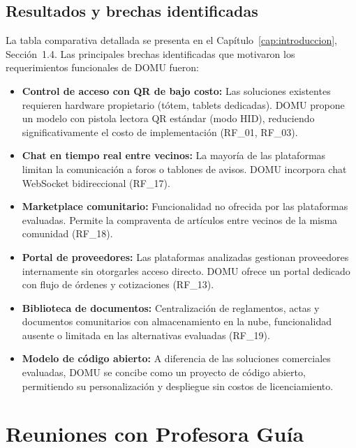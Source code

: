 \subsection{Resultados y brechas identificadas}

La tabla comparativa detallada se presenta en el Capítulo~\ref{cap:introduccion}, Sección~1.4. Las principales brechas identificadas que motivaron los requerimientos funcionales de DOMU fueron:

\begin{itemize}
    \item \textbf{Control de acceso con QR de bajo costo:} Las soluciones existentes requieren hardware propietario (tótem, tablets dedicadas). DOMU propone un modelo con pistola lectora QR estándar (modo HID), reduciendo significativamente el costo de implementación (RF\_01, RF\_03).

    \item \textbf{Chat en tiempo real entre vecinos:} La mayoría de las plataformas limitan la comunicación a foros o tablones de avisos. DOMU incorpora chat WebSocket bidireccional (RF\_17).

    \item \textbf{Marketplace comunitario:} Funcionalidad no ofrecida por las plataformas evaluadas. Permite la compraventa de artículos entre vecinos de la misma comunidad (RF\_18).

    \item \textbf{Portal de proveedores:} Las plataformas analizadas gestionan proveedores internamente sin otorgarles acceso directo. DOMU ofrece un portal dedicado con flujo de órdenes y cotizaciones (RF\_13).

    \item \textbf{Biblioteca de documentos:} Centralización de reglamentos, actas y documentos comunitarios con almacenamiento en la nube, funcionalidad ausente o limitada en las alternativas evaluadas (RF\_19).

    \item \textbf{Modelo de código abierto:} A diferencia de las soluciones comerciales evaluadas, DOMU se concibe como un proyecto de código abierto, permitiendo su personalización y despliegue sin costos de licenciamiento.
\end{itemize}

\section{Reuniones con Profesora Guía}

